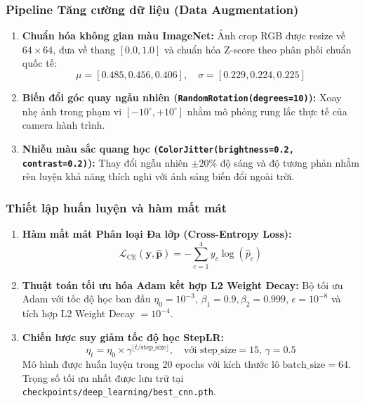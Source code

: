 \subsubsection{Pipeline Tăng cường dữ liệu (Data Augmentation)}
\label{subsubsec:lenet_augmentation}

\begin{enumerate}
    \item \textbf{Chuẩn hóa không gian màu ImageNet:} Ảnh crop RGB được resize về $64 \times 64$, đưa về thang $[0.0, 1.0]$ và chuẩn hóa Z-score theo phân phối chuẩn quốc tế:
    \begin{equation}
        \mu = [0.485, 0.456, 0.406], \quad \sigma = [0.229, 0.224, 0.225]
        \label{eq:imagenet_norm}
    \end{equation}
    \item \textbf{Biến đổi góc quay ngẫu nhiên (\texttt{RandomRotation(degrees=10)}):} Xoay nhẹ ảnh trong phạm vi $[-10^\circ, +10^\circ]$ nhằm mô phỏng rung lắc thực tế của camera hành trình.
    \item \textbf{Nhiễu màu sắc quang học (\texttt{ColorJitter(brightness=0.2, contrast=0.2)}):} Thay đổi ngẫu nhiên $\pm 20\%$ độ sáng và độ tương phản nhằm rèn luyện khả năng thích nghi với ánh sáng biến đổi ngoài trời.
\end{enumerate}

\subsubsection{Thiết lập huấn luyện và hàm mất mát}
\label{subsubsec:lenet_training}

\begin{enumerate}
    \item \textbf{Hàm mất mát Phân loại Đa lớp (Cross-Entropy Loss):}
    \begin{equation}
        \mathcal{L}_{\text{CE}}(\mathbf{y}, \hat{\mathbf{p}}) = -\sum_{c=1}^4 y_c \log(\hat{p}_c)
        \label{eq:ce_loss}
    \end{equation}
    \item \textbf{Thuật toán tối ưu hóa Adam kết hợp L2 Weight Decay:} Bộ tối ưu Adam với tốc độ học ban đầu $\eta_0 = 10^{-3}$, $\beta_1 = 0.9, \beta_2 = 0.999$, $\epsilon = 10^{-8}$ và tích hợp L2 Weight Decay $= 10^{-4}$.
    \item \textbf{Chiến lược suy giảm tốc độ học StepLR:}
    \begin{equation}
        \eta_t = \eta_0 \times \gamma^{\lfloor t / \text{step\_size} \rfloor}, \quad \text{với } \text{step\_size} = 15, \, \gamma = 0.5
        \label{eq:steplr}
    \end{equation}
    Mô hình được huấn luyện trong 20 epochs với kích thước lô $\text{batch\_size} = 64$. Trọng số tối ưu nhất được lưu trữ tại \texttt{checkpoints/deep\_learning/best\_cnn.pth}.
\end{enumerate}

